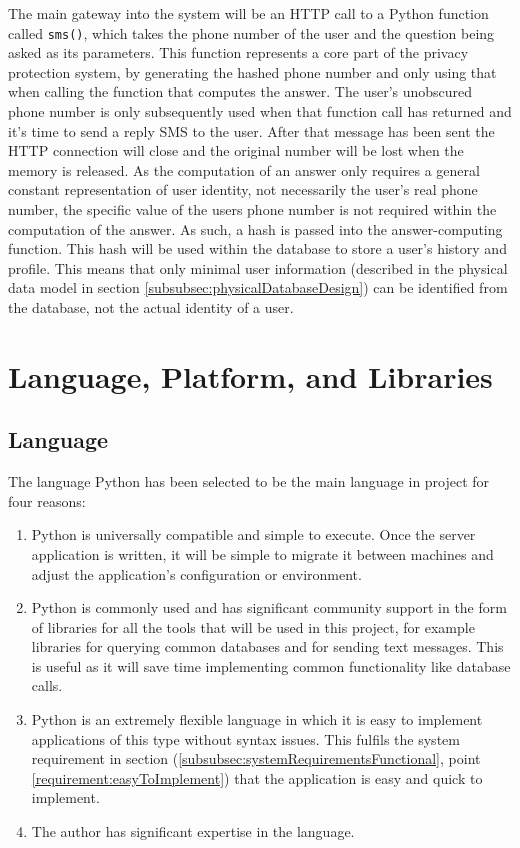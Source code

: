 \documentclass[authoryearcitations]{UoYCSproject}
\begin{document}
The main gateway into the system will be an HTTP call to a Python function called \texttt{sms()}, which takes the phone number of the user and the question being asked as its parameters.  This function represents a core part of the privacy protection system, by generating the hashed phone number and only using that when calling the function that computes the answer.  The user's unobscured phone number is only subsequently used when that function call has returned and it's time to send a reply SMS to the user. After that message has been sent the HTTP connection will close and the original number will be lost when the memory is released. As the computation of an answer only requires a general constant representation of user identity, not necessarily the user's real phone number, the specific value of the users phone number is not required within the computation of the answer.  As such, a hash is passed into the answer-computing function.  This hash will be used within the database to store a user's history and profile.  This means that only minimal user information (described in the physical data model in section \ref{subsubsec:physicalDatabaseDesign}) can be identified from the database, not the actual identity of a user.

\section{Language, Platform, and Libraries}
\subsection{Language}
\label{section:designLanguage}
The language Python has been selected to be the main language in project for four reasons:
\begin{enumerate}
  \item Python is universally compatible and simple to execute.  Once the server application is written, it will be simple to migrate it between machines and adjust the application's configuration or environment.
  \item Python is commonly used and has significant community support in the form of libraries for all the tools that will be used in this project, for example libraries for querying common databases and for sending text messages.  This is useful as it will save time implementing common functionality like database calls.
  \item Python is an extremely flexible language in which it is easy to implement applications of this type without syntax issues.  This fulfils the system requirement in section (\ref{subsubsec:systemRequirementsFunctional}, point \ref{requirement:easyToImplement}) that the application is easy and quick to implement.
  \item The author has significant expertise in the language.
\end{enumerate}
\end{document}

